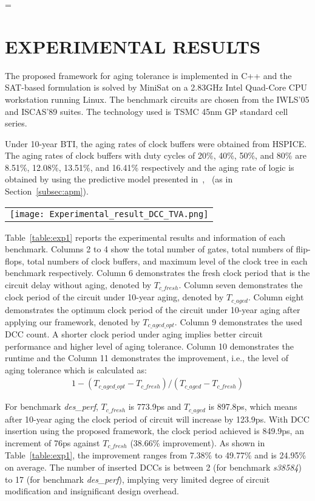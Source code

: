 =\section{EXPERIMENTAL RESULTS}
\label{sec:exp}
The proposed framework for aging tolerance is implemented in C++ and the SAT-based formulation is solved by MiniSat on a 2.83GHz Intel Quad-Core CPU workstation running Linux. The benchmark circuits are chosen from the IWLS'05 and ISCAS'89 suites. The technology used is TSMC 45nm GP standard cell series.

Under 10-year BTI, the aging rates of clock buffers were obtained from HSPICE. The aging rates of clock buffers with duty cycles of 20\%, 40\%, 50\%, and 80\% are 8.51\%, 12.08\%, 13.51\%, and 16.41\% respectively and the aging rate of logic is obtained by using the predictive model presented in~\cite{wang2010impact},~\cite{wang2007efficient} (as in Section~\ref{subsec:apm}).

\begin{table*}
\centering
\caption{Results of aging tolerance}
	\begin{tabular}{l}
	\texttt{[image: Experimental\_result\_DCC\_TVA.png]}
	\end{tabular}
\label{table:exp1}
\end{table*}

Table~\ref{table:exp1} reports the experimental results and information of each benchmark. Columns 2 to 4 show the total number of gates, total numbers of flip-flops, total numbers of clock buffers, and maximum level of the clock tree in each benchmark respectively. Column 6 demonstrates the fresh clock period that is the circuit delay without aging, denoted by $T_{c\_fresh}$. Column seven demonstrates the clock period of the circuit under 10-year aging, denoted by $T_{c\_aged}$. Column eight demonstrates the optimum clock period of the circuit under 10-year aging after applying our framework, denoted by $T_{c\_aged\_opt}$. Column 9 demonstrates the used DCC count. A shorter clock period under aging implies better circuit performance and higher level of aging tolerance. Column 10 demonstrates the runtime and the Column 11 demonstrates the improvement, i.e., the level of aging tolerance which is calculated as:
\begin{gather*}
1 - (T_{c\_aged\_opt} - T_{c\_fresh}) / (T_{c\_aged} - T_{c\_fresh})
\end{gather*}

For benchmark \textit{des\_perf}, $T_{c\_fresh}$ is 773.9ps and $T_{c\_aged}$ is 897.8ps, which means after 10-year aging the clock period of circuit will increase by 123.9ps. With DCC insertion using the proposed framework, the clock period achieved is 849.9ps, an increment of 76ps against $T_{c\_fresh}$ (38.66\% improvement). As shown in Table~\ref{table:exp1}, the improvement ranges from 7.38\% to 49.77\% and is 24.95\% on average. \iffalse As shown in Table~\ref{table:exp2}.\fi The number of inserted DCCs is between 2 (for benchmark \textit{s38584}) to 17 (for benchmark \textit{des\_perf}), implying very limited degree of circuit modification and insignificant design overhead.

